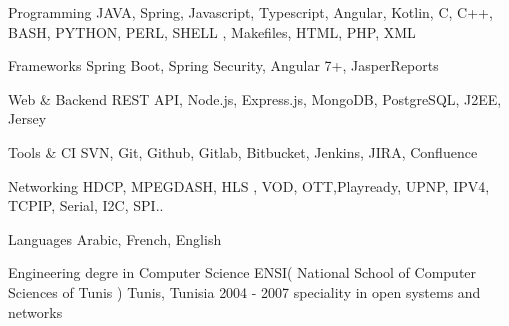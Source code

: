\documentclass[11pt, a4paper]{awesome-cv} %
\begin{document}
\makecvheader %


\begin{cvskills}

    \cvskill
    {Programming} %
    {JAVA, Spring, Javascript, Typescript, Angular, Kotlin, C, C++, BASH, PYTHON, PERL, SHELL , Makefiles, HTML, PHP, XML  }%

    \cvskill
    {Frameworks} %
    {Spring Boot, Spring Security, Angular 7+, JasperReports }%

    \cvskill
    {Web \& Backend} %
    { REST API, Node.js, Express.js, MongoDB, PostgreSQL, J2EE, Jersey }%

    \cvskill
    {Tools \& CI} %
    {SVN, Git, Github, Gitlab, Bitbucket, Jenkins, JIRA, Confluence }%

    \cvskill
    {Networking} %
    { HDCP, MPEGDASH, HLS , VOD, OTT,Playready, UPNP, IPV4, TCPIP, Serial, I2C, SPI..}%

    \cvskill
    {Languages} %
    {Arabic, French, English} %

\end{cvskills}


\begin{cventries}

    \cventry
    {Engineering degre in Computer Science} %
    {ENSI( National School of Computer Sciences of Tunis )} %
    {Tunis, Tunisia} %
    {2004 - 2007} %
    { %
        speciality in open systems and networks
    }

\end{cventries}
\end{document}
